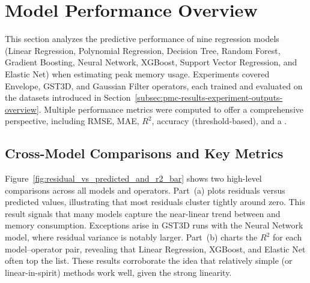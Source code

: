 \section{Model Performance Overview}
\label{sec:pmc-results-model-performance-overview}

This section analyzes the predictive performance of nine regression models (Linear Regression, Polynomial Regression, Decision Tree, Random Forest, Gradient Boosting, Neural Network, XGBoost, Support Vector Regression, and Elastic Net) when estimating peak memory usage.
Experiments covered Envelope, \ac{GST3D}, and Gaussian Filter operators, each trained and evaluated on the datasets introduced in Section~\ref{subsec:pmc-results-experiment-outputs-overview}.
Multiple performance metrics were computed to offer a comprehensive perspective, including \ac{RMSE}, \ac{MAE}, $R^2$, accuracy (threshold-based), and a .

\subsection{Cross-Model Comparisons and Key Metrics}
\label{subsec:cross-model-comparisons-and-key-metrics}

Figure~\ref{fig:residual_vs_predicted_and_r2_bar} shows two high-level comparisons across all models and operators.
Part~(a) plots residuals versus predicted values, illustrating that most residuals cluster tightly around zero.
This result signals that many models capture the near-linear trend between  and memory consumption.
Exceptions arise in \ac{GST3D} runs with the Neural Network model, where residual variance is notably larger.
Part~(b) charts the $R^2$ for each model--operator pair, revealing that Linear Regression, XGBoost, and Elastic Net often top the list.
These results corroborate the idea that relatively simple (or linear-in-spirit) methods work well, given the strong  linearity.

